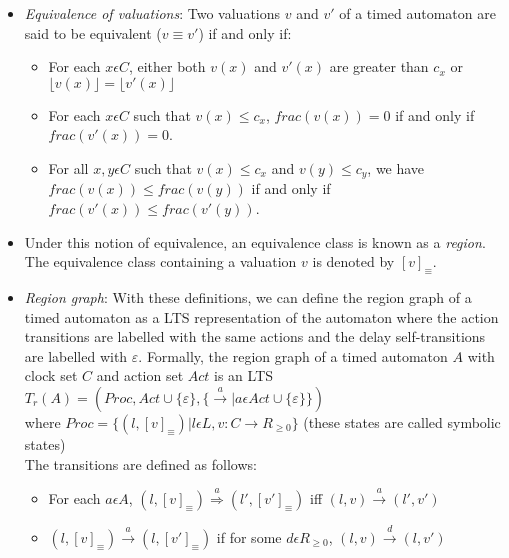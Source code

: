 \documentclass{article}
\begin{document}
\begin{itemize}

\item \emph{Equivalence of valuations}: Two valuations $v$ and $v'$ of
  a timed automaton are said to be equivalent ($v \equiv v'$) if and
  only if:
  \begin{itemize}
    \item For each $x \epsilon C$, either both $v(x)$ and $v'(x)$ are
      greater than $c_x$ or $\lfloor v(x) \rfloor = \lfloor v'(x)
      \rfloor$
    \item For each $x \epsilon C$ such that $v(x) \le c_x$,
      $frac(v(x))=0$ if and only if $frac(v'(x))=0$.
    \item For all $x,y \epsilon C$ such that $v(x) \le c_x$ and $v(y)
      \le c_y$, we have $frac(v(x)) \le frac(v(y))$ if and only if
      $frac(v'(x)) \le frac(v'(y))$.
  \end{itemize}

\item Under this notion of equivalence, an equivalence class is known
  as a \emph{region}. The equivalence class containing a valuation $v$
  is denoted by $[v]_{\equiv}$.

\item \emph{Region graph}: With these definitions, we can define the
  region graph of a timed automaton as a LTS representation of the
  automaton where the action transitions are labelled with the same
  actions and the delay self-transitions are labelled with
  $\varepsilon$.
  Formally, the region graph of a timed automaton $A$ with clock set $C$
  and action set $Act$ is an LTS\\
  $T_r(A) = (Proc,Act \cup \{\varepsilon\}, \{\xrightarrow{a}|a \epsilon
    Act \cup \{\varepsilon\}\})$\\
    where $Proc = \{(l, [v]_{\equiv}) | l \epsilon L, v: C \rightarrow
    R_{\ge 0}\}$ (these states are called symbolic states)\\
    The transitions are defined as follows:
    \begin{itemize}
      \item For each $a \epsilon A$, $(l, [v]_{\equiv})
        \overset{a}{\Rightarrow} (l', [v']_{\equiv})$ iff $(l,v)
        \overset{a}{\rightarrow} (l', v')$
      \item $(l, [v]_{\equiv}) \xrightarrow{a} (l, [v']_{\equiv})$ if
        for some $d \epsilon R_{\ge 0}$, $(l, v) \xrightarrow{d} (l,
        v')$
    \end{itemize}

\end{itemize}
\end{document}
